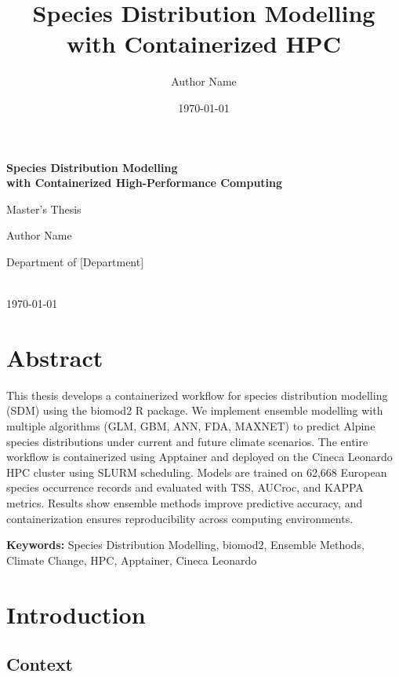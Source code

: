 \documentclass[12pt,a4paper]{report}
\title{\bfseries Species Distribution Modelling with Containerized HPC}
\author{Author Name}
\date{\today}
\begin{document}
\begin{titlepage}
    \centering
    \vspace*{3cm}
    
    {\Huge\bfseries Species Distribution Modelling\\
    with Containerized High-Performance Computing}
    
    \vspace{2cm}
    {\Large Master's Thesis}
    
    \vspace{3cm}
    {\large Author Name}
    
    \vspace{2cm}
    {\large Department of [Department]\\
    [University]\\
    [Year]}
    
    \vfill
    {\small \today}
\end{titlepage}

\chapter*{Abstract}
This thesis develops a containerized workflow for species distribution modelling (SDM) using the biomod2 R package. We implement ensemble modelling with multiple algorithms (GLM, GBM, ANN, FDA, MAXNET) to predict Alpine species distributions under current and future climate scenarios. The entire workflow is containerized using Apptainer and deployed on the Cineca Leonardo HPC cluster using SLURM scheduling. Models are trained on 62,668 European species occurrence records and evaluated with TSS, AUCroc, and KAPPA metrics. Results show ensemble methods improve predictive accuracy, and containerization ensures reproducibility across computing environments.

\vspace{0.5cm}
\noindent\textbf{Keywords:} Species Distribution Modelling, biomod2, Ensemble Methods, Climate Change, HPC, Apptainer, Cineca Leonardo

\tableofcontents

\chapter{Introduction}

\section{Context}
\end{document}
